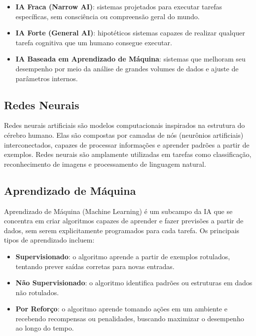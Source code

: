 \begin{itemize}
    \item \textbf{IA Fraca (Narrow AI)}: sistemas projetados para executar tarefas específicas, sem consciência ou compreensão geral do mundo.
    \item \textbf{IA Forte (General AI)}: hipotéticos sistemas capazes de realizar qualquer tarefa cognitiva que um humano consegue executar.
    \item \textbf{IA Baseada em Aprendizado de Máquina}: sistemas que melhoram seu desempenho por meio da análise de grandes volumes de dados e ajuste de parâmetros internos.
\end{itemize}

\subsection{Redes Neurais}

Redes neurais artificiais são modelos computacionais inspirados na estrutura do cérebro humano. Elas são compostas por camadas de nós (neurônios artificiais) interconectados, capazes de processar informações e aprender padrões a partir de exemplos. Redes neurais são amplamente utilizadas em tarefas como classificação, reconhecimento de imagens e processamento de linguagem natural.

\subsection{Aprendizado de Máquina}

Aprendizado de Máquina (Machine Learning) é um subcampo da IA que se concentra em criar algoritmos capazes de aprender e fazer previsões a partir de dados, sem serem explicitamente programados para cada tarefa. Os principais tipos de aprendizado incluem:

\begin{itemize}
    \item \textbf{Supervisionado}: o algoritmo aprende a partir de exemplos rotulados, tentando prever saídas corretas para novas entradas.
    \item \textbf{Não Supervisionado}: o algoritmo identifica padrões ou estruturas em dados não rotulados.
    \item \textbf{Por Reforço}: o algoritmo aprende tomando ações em um ambiente e recebendo recompensas ou penalidades, buscando maximizar o desempenho ao longo do tempo.
\end{itemize}

